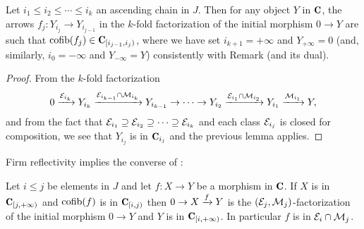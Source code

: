 \documentclass[a4paper,12pt]{amsart}
\begin{document}
\begin{corollary} \label{cor:perPostnikov}
Let $i_1\leq i_2\leq\cdots\leq i_k$ an ascending chain in $J$. Then for any object $Y$ in $\C$, the arrows $f_j\colon Y_{i_j}\to Y_{i_{j-1}}$ in the $k$-fold factorization of the initial morphism $0\to Y$ are such that $\cofib(f_j)\in \C_{[i_{j-1},i_j)}$, where we have set $i_{k+1}=+\infty$ and $Y_{+\infty}=0$ (and, similarly, $i_{0}=-\infty$ and $Y_{-\infty}=Y$) consistently with Remark  (and its dual).
\end{corollary}
\begin{proof}
From the $k$-fold factorization
\[
0 \xrightarrow{\mathcal{E}_{i_k}} Y_{i_k} \xrightarrow{\mathcal{E}_{i_{k-1}}\cap \mathcal{M}_{i_k}} Y_{i_{k-1}}\to\dots\to Y_{i_{2}} \xrightarrow{\mathcal{E}_{i_{1}}\cap \mathcal{M}_{i_{2}}} Y_{i_1} \xrightarrow{\mathcal{M}_{i_{1}}} Y,
\]
and from the fact that $\mathcal{E}_{i_1}\supseteq \mathcal{E}_{i_2} \supseteq\dots\supseteq \mathcal{E}_{i_k}$ and each class $\mathcal{E}_{i_j}$ is closed for composition, we see that $Y_{i_j}$ is in $\C_{i_{j}}$ and the previous lemma applies.
\end{proof}
Firm reflectivity implies the converse of :
\begin{lemma}\label{lemma.vice.versa}
Let $i\leq j$ be elements in $J$ and let $f\colon X\to Y$ be a morphism in $\C$. If $X$ is in $\C_{[j,+\infty)}$ and $\operatorname{cofib}(f)$ is in $\C_{[i,j)}$ then $0\to X\xrightarrow{f}Y$ is the $(\mathcal{E}_j,\mathcal{M}_j)$-factorization of the initial morphism $0\to Y$ and $Y$ is in $\C_{[i,+\infty)}$. In particular $f$ is in $\mathcal{E}_i\cap \mathcal{M}_j$. \end{lemma}
\end{document}
